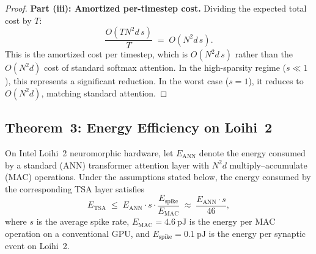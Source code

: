 \documentclass{article}
\begin{document}
\begin{proof}
\medskip
\noindent\textbf{Part (iii): Amortized per-timestep cost.}
Dividing the expected total cost by $T$:
\[
  \frac{O(T N^2 d \, s)}{T} \;=\; O(N^2 d \, s).
\]
This is the amortized cost per timestep, which is $O(N^2 d \, s)$
rather than the $O(N^2 d)$ cost of standard softmax attention.
In the high-sparsity regime ($s \ll 1$), this represents a significant
reduction.  In the worst case ($s = 1$), it reduces to $O(N^2 d)$,
matching standard attention.
\end{proof}


\subsection{Theorem~3: Energy Efficiency on Loihi~2}\label{sec:thm3}

\begin{theorem}
\label{thm:energy}
On Intel Loihi~2 neuromorphic hardware, let $E_{\mathrm{ANN}}$ denote
the energy consumed by a standard (ANN) transformer attention layer with
$N^2 d$ multiply--accumulate (MAC) operations.  Under the assumptions
stated below, the energy consumed by the corresponding TSA layer satisfies
\begin{equation}\label{eq:energy_bound}
  E_{\mathrm{TSA}} \;\le\; E_{\mathrm{ANN}} \cdot s \cdot
    \frac{E_{\mathrm{spike}}}{E_{\mathrm{MAC}}}
  \;\approx\; \frac{E_{\mathrm{ANN}} \cdot s}{46},
\end{equation}
where $s$ is the average spike rate,
$E_{\mathrm{MAC}} = 4.6~\mathrm{pJ}$ is the energy per MAC operation
on a conventional GPU, and
$E_{\mathrm{spike}} = 0.1~\mathrm{pJ}$ is the energy per synaptic
event on Loihi~2.
\end{theorem}
\end{document}
